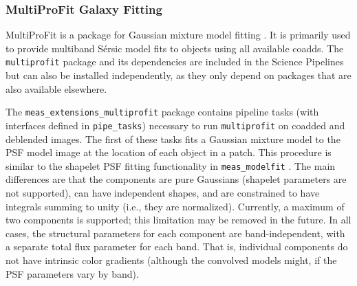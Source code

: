 \subsubsection{MultiProFit Galaxy Fitting}
\label{sec:multiprofit}

MultiProFit is a package for Gaussian mixture model fitting \citep{DMTN-312}.
It is primarily used to provide multiband S\'ersic model fits to objects using all available coadds.
The \texttt{multiprofit} package and its dependencies are included in the Science Pipelines but can also be installed independently, as they only depend on packages that are also available elsewhere.

The \texttt{meas\_extensions\_multiprofit} package contains pipeline tasks (with interfaces defined in \texttt{pipe\_tasks}) necessary to run \texttt{multiprofit} on coadded and deblended images.
The first of these tasks fits a Gaussian mixture model to the PSF model image at the location of each object in a patch.
This procedure is similar to the shapelet PSF fitting functionality in \texttt{meas\_modelfit} .
The main differences are that the components are pure Gaussians (shapelet parameters are not supported), can have independent shapes, and are constrained to have integrals summing to unity (i.e., they are normalized).
Currently, a maximum of two components is supported; this limitation may be removed in the future.
In all cases, the structural parameters for each component are band-independent, with a separate total flux parameter for each band.
That is, individual components do not have intrinsic color gradients (although the convolved models might, if the PSF parameters vary by band).
